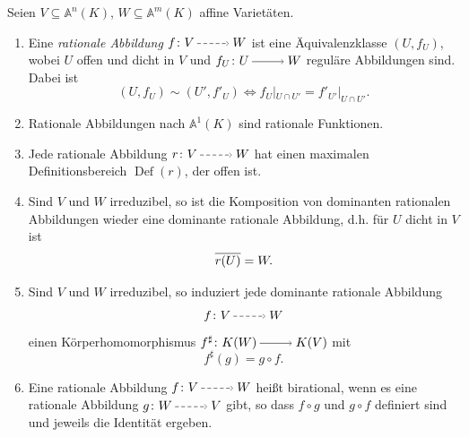 \documentclass[a4paper,12pt,index=toc]{scrbook}
\theoremstyle{keinenummern} %
\def\A{\mathbb{A}}
\newcommand{\Def}{\operatorname{Def}}
\newcommand{\restrict}[1]{|_{#1}}
\def\Bar#1{\ensuremath\overline{#1}}
\begin{document}
\begin{db}\label{1.6.5} Seien $V\subseteq \A^n(K)$, $W\subseteq \A^m(K)$ affine Varietäten.
  \begin{enumerate}
  \item\label{1.6.5a} Eine \emph{rationale Abbildung} $f \colon V\ppf W$ ist eine Äquivalenzklasse $(U,f_U)$, wobei $U$ offen und dicht in $V$ und $f_U \colon U\ra W$ reguläre Abbildungen sind. Dabei ist
  \[(U,f_U)\sim (U',f'_U) \iff f_U\restrict{U\cap U'}=f'_{U'}\restrict{U\cap U'}.\]
  \item\label{1.6.5b} Rationale Abbildungen nach $\A^1(K)$ sind rationale Funktionen.
  \item\label{1.6.5c} Jede rationale Abbildung $r \colon V\ppf W$ hat einen maximalen Definitionsbereich $\Def(r)$, der offen ist.
  \item\label{1.6.5d} Sind $V$ und $W$ irreduzibel, so ist die Komposition von dominanten rationalen Abbildungen wieder eine dominante rationale Abbildung, d.h. für $U$ dicht in $V$ ist \[\Bar{r(U)}=W.\]
  \item\label{1.6.5e} Sind $V$ und $W$ irreduzibel, so induziert jede dominante rationale Abbildung \[f \colon V\ppf W\] einen Körperhomomorphismus $f^{\sharp} \colon K(W)\ra K(V)$ mit \[f^{\sharp}(g)=g\circ f.\]
  \item\label{1.6.5f} Eine rationale Abbildung $f \colon V\ppf W$ heißt birational, wenn es eine rationale Abbildung $g \colon W\ppf V$ gibt, so dass $f\circ g$ und $g\circ f$ definiert sind und jeweils die Identität ergeben.
  \end{enumerate}
\end{db}
\end{document}
